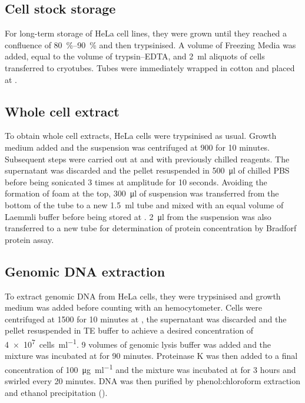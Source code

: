     \subsection{Cell stock storage}
      For long-term storage of HeLa cell lines, they were grown until
      they reached a confluence of \SIrange{80}{90}{\percent} and then
      trypsinised. A volume of Freezing Media was added, equal
      to the volume of trypsin--EDTA, and \SI{2}{\ml} aliquots of
      cells transferred to cryotubes. Tubes were immediately wrapped in
      cotton and placed at .

    \subsection{Whole cell extract}
      \label{sec:cell-extract}
      To obtain whole cell extracts, HeLa cells were trypsinised as usual. Growth
      medium added and the suspension was centrifuged at \SI{900}{\gn}
      for 10 minutes.
      Subsequent steps were carried out at  and with previously
      chilled reagents. The supernatant was discarded and the pellet
      resuspended in \SI{500}{\ul} of chilled PBS before being
      sonicated 3 times at  amplitude for 10 seconds. Avoiding the
      formation of foam at the top, \SI{300}{\ul} of suspension was transferred
      from the bottom of the tube to a new \SI{1.5}{\ml} tube
      and mixed with an equal
      volume of Laemmli buffer before being stored at .
      \SI{2}{\ul} from the suspension was also transferred to a new tube
      for determination of protein concentration by Bradforf protein assay.

    \subsection{Genomic DNA extraction}
      To extract genomic DNA from HeLa cells, they were trypsinised and
      growth medium was added before counting with an hemocytometer.
      Cells were centrifuged at \SI{1500}{\gn} for 10 minutes at , the
      supernatant was discarded
      and the pellet resuspended in TE buffer to achieve
      a desired concentration of \SI{4e7}{cells\per\ml}. 9 volumes of
      genomic lysis buffer was added
      and the mixture was incubated at  for
      90 minutes. Proteinase K was then added to a final concentration of
      \SI{100}{\ug\per\ml} and the mixture was
      incubated at  for 3 hours and
      swirled every 20 minutes. DNA was then purified by
      phenol:chloroform extraction  and ethanol
      precipitation ().

